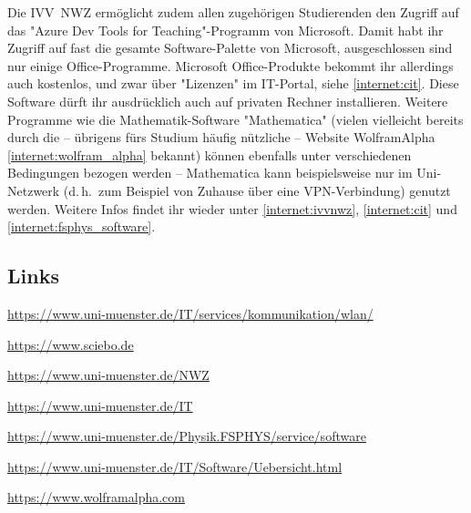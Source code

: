 \begin{multicols}{2}
Die IVV~NWZ ermöglicht zudem allen zugehörigen Studierenden den Zugriff auf das "Azure Dev Tools for Teaching"-Programm von Microsoft.
Damit habt ihr Zugriff auf fast die gesamte Software-Palette von Microsoft, ausgeschlossen sind nur einige Office-Programme. 
Microsoft Office-Produkte bekommt ihr allerdings auch kostenlos, und zwar über "Lizenzen" im IT-Portal, siehe \cref{internet:cit}.
Diese Software dürft ihr ausdrücklich auch auf privaten Rechner installieren.
Weitere Programme wie die Mathematik-Software "Mathematica" (vielen vielleicht bereits durch die -- übrigens fürs Studium häufig nützliche -- Website WolframAlpha \cref{internet:wolfram_alpha} bekannt) können ebenfalls unter verschiedenen Bedingungen bezogen werden -- Mathematica kann beispielsweise nur im Uni-Netzwerk (d.\,h.\ zum Beispiel von Zuhause über eine VPN-Verbindung) genutzt werden.
Weitere Infos findet ihr wieder unter \cref{internet:ivvnwz}, \cref{internet:cit} und \cref{internet:fsphys_software}.

\subsection{Links}
\begin{flushleft}
	\begin{fibelurl}
		\url{https://www.uni-muenster.de/IT/services/kommunikation/wlan/}
		\label{internet:wlan}
	\end{fibelurl}
	\begin{fibelurl}
		\url{https://www.sciebo.de}
		\label{internet:sciebo}
	\end{fibelurl}
	\begin{fibelurl}
		\url{https://www.uni-muenster.de/NWZ}
		\label{internet:ivvnwz}
	\end{fibelurl}
	\begin{fibelurl}
		\url{https://www.uni-muenster.de/IT}
		\label{internet:cit}
	\end{fibelurl}
	\begin{fibelurl}
		\url{https://www.uni-muenster.de/Physik.FSPHYS/service/software}
		\label{internet:fsphys_software}
	\end{fibelurl}
	\begin{fibelurl}
		\url{https://www.uni-muenster.de/IT/Software/Uebersicht.html}
		\label{internet:cit_software}
	\end{fibelurl}
	\begin{fibelurl}
		\url{https://www.wolframalpha.com}
		\label{internet:wolfram_alpha}
	\end{fibelurl}
\end{flushleft}


\begin{center}
\end{center}

\end{multicols}


